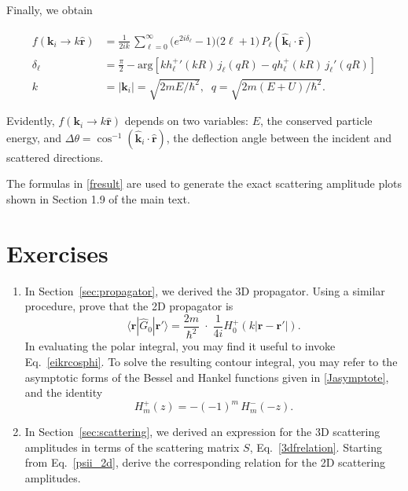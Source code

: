\documentclass[pra,12pt]{revtex4}
\begin{document}
Finally, we obtain
\begin{framed}
\begin{equation}
  \begin{aligned}f(\mathbf{k}_i \rightarrow k\hat{\mathbf{r}}) &= \frac{1}{2ik}\, \sum_{\ell =0}^\infty \big(e^{2i\delta_\ell} - 1\big) \big(2\ell+1\big)\, P_{\ell}(\hat{\mathbf{k}}_i\cdot \hat{\mathbf{r}}) \\ \delta_\ell &= \frac{\pi}{2} - \mathrm{arg}\!\left[k{h_\ell^+}'(kR) \, j_\ell(qR) - qh_\ell^+(kR)\, j_\ell'(qR)\right] \\ k &= |\mathbf{k}_i| = \sqrt{2mE/\hbar^2}, \;\; q = \sqrt{2m(E+U)/\hbar^2}.\end{aligned}
  \label{fresult}
\end{equation}
\end{framed}
\noindent
Evidently, $f(\mathbf{k}_i \rightarrow k\hat{\mathbf{r}})$ depends on
two variables: $E$, the conserved particle energy, and $\Delta \theta
= \cos^{-1}(\hat{\mathbf{k}}_i\cdot \hat{\mathbf{r}})$, the deflection
angle between the incident and scattered directions.

The formulas in \eqref{fresult} are used to generate the exact
scattering amplitude plots shown in Section 1.9 of the main text.


\section*{Exercises}

\begin{enumerate}
\item \label{ex:2dpropagator}
  In Section~\ref{sec:propagator}, we derived the 3D propagator.
  Using a similar procedure, prove that the 2D propagator is
  \begin{equation}
    \langle\mathbf{r}|\hat{G}_0|\mathbf{r}'\rangle = \frac{2m}{\hbar^2}\;
    \cdot\; \frac{1}{4i} H^+_0(k|\mathbf{r}-\mathbf{r'}|).
  \end{equation}
  In evaluating the polar integral, you may find it useful to invoke
  Eq.~\eqref{eikrcosphi}.  To solve the resulting contour integral,
  you may refer to the asymptotic forms of the Bessel and Hankel
  functions given in \eqref{Jasymptote}, and the identity
  \begin{equation}
    H_m^+(z) = - (-1)^m \, H_m^-(-z).
  \end{equation}

\item \label{ex:2dscattering} In Section~\ref{sec:scattering}, we
  derived an expression for the 3D scattering amplitudes in terms of
  the scattering matrix $S$, Eq.~\eqref{3dfrelation}.  Starting from
  Eq.~\eqref{psii_2d}, derive the corresponding relation for the 2D
  scattering amplitudes.

\end{enumerate}
\end{document}
